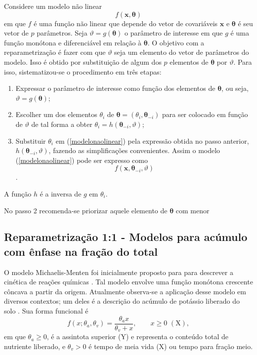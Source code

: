 Considere um modelo não linear
\begin{equation}\label{modelonaolinear}
f(\mathbf{x}, \boldsymbol{\theta})
\end{equation}
em que $f$ é uma função não linear que depende do vetor de covariáveis
$\mathbf{x}$ e $\boldsymbol{\theta}$ é seu vetor de $p$
parâmetros. Seja $\vartheta = g(\boldsymbol{\theta})$ o parâmetro de
interesse em que $g$ é uma função monótona e diferenciável em relação
à $\boldsymbol{\theta}$.  O objetivo com a reparametrização é fazer
com que $\vartheta$ seja um elemento do vetor de parâmetros do
modelo. Isso é obtido por substituição de algum dos $p$ elementos de
$\boldsymbol{\theta}$ por $\vartheta$.  Para isso, sistematizou-se o
procedimento em três etapas:
\begin{enumerate}
\item Expressar o parâmetro de interesse como função dos elementos de
  $\boldsymbol{\theta}$, ou seja, $\vartheta =
  g(\boldsymbol{\theta})$;
\item Escolher um dos elementos $\theta_i$ de $\boldsymbol{\theta} =
  (\theta_i, \boldsymbol{\theta}_{-i})$ para ser colocado em função de
  $\vartheta$ de tal forma a obter $\theta_i =
  h(\boldsymbol{\theta}_{-i}, \vartheta)$;
\item Substituir $\theta_i$ em (\ref{modelonaolinear}) pela expressão
  obtida no passo anterior, $h(\boldsymbol{\theta}_{-i}, \vartheta)$,
  fazendo as simplificações convenientes. Assim o modelo
  (\ref{modelonaolinear}) pode ser expresso como
$$f(\mathbf{x}, \boldsymbol{\theta}_{-i}, \vartheta)$$.
\end{enumerate}
A função $h$ é a inversa de $g$ em $\theta_i$.

No passo 2 recomenda-se priorizar aquele elemento de
$\boldsymbol{\theta}$ com menor

\subsection{Reparametrização 1:1 - Modelos para acúmulo com ênfase na fração do total}

O modelo Michaelis-Menten foi inicialmente proposto para para
descrever a cinética de reações químicas \cite{Michaelis1913}. Tal
modelo envolve uma função monótona crescente côncava a partir da
origem.  Atualmente observa-se a aplicação desse modelo em diversos
contextos; um deles é a descrição do acúmulo de potássio liberado do
solo \cite{Zeviani2012}. Sua forma funcional é
\begin{equation}
f(x; \theta_a, \theta_v) = \frac{\theta_a x}{\theta_v+x}, \qquad
x\geq0\,\, (\text{X}),
\end{equation}
em que $\theta_a\geq 0$, é a assintota superior (Y) e representa o
conteúdo total de nutriente liberado, e $\theta_v> 0$ é tempo de meia
vida (X) ou tempo para fração meio.

